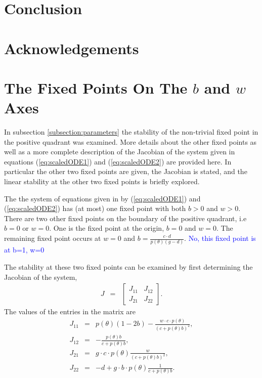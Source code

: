 \documentclass[review,authoryear]{elsarticle}
\begin{document}
\section{Conclusion}

\section{Acknowledgements}

\clearpage

\appendix

\section{The Fixed Points On The $b$ and $w$ Axes}
\label{appendix:otherFixedPoints}

In subsection \ref{subsection:parameters} the stability of the
non-trivial fixed point in the positive quadrant was examined. More details about the other
fixed points as well as a more complete description of the Jacobian of
the system given in equations (\ref{eq:scaledODE1}) and
(\ref{eq:scaledODE2}) are provided here. In particular the other two
fixed points are given,  the Jacobian is stated, and the linear
stability at the other two fixed points is briefly explored.

The the system of equations given in by
(\ref{eq:scaledODE1}) and (\ref{eq:scaledODE2}) has (at most) one fixed point
with both $b>0$ and $w>0$. There are two other fixed points on the boundary of the positive quadrant, i.e $b=0$ or $w=0$.  One is the fixed point at the origin, $b=0$ and $w=0$.
The remaining fixed point occurs at $w=0$ and $b=\frac{c\cdot
  d}{p(\theta)\left(g - d\right)}$. \textcolor{blue} {No, this fixed point is at b=1, w=0}
  

The stability at these two fixed points can be examined by first
determining the Jacobian of the system,
\begin{eqnarray*}
  J & = & \left[
          \begin{array}{rr}
            J_{11} & J_{12} \\
            J_{21} & J_{22}
          \end{array}
          \right].
\end{eqnarray*}
The values of the entries in the matrix are
\begin{eqnarray*}
  J_{11} & = & p(\theta)\left(1-2b\right) -
               \frac{w\cdot c \cdot p(\theta)}{\left( c + p(\theta)b \right)^2}, \\
  J_{12} & = & -\frac{p(\theta)b}{c+p(\theta)b}, \\
  J_{21} & = & g\cdot c \cdot  p(\theta) \frac{w}{\left(c+p(\theta)b\right)^2}, \\
  J_{22} & = & -d + g\cdot b \cdot  p(\theta) \frac{1}{c+p(\theta)b}.
\end{eqnarray*}
\end{document}
